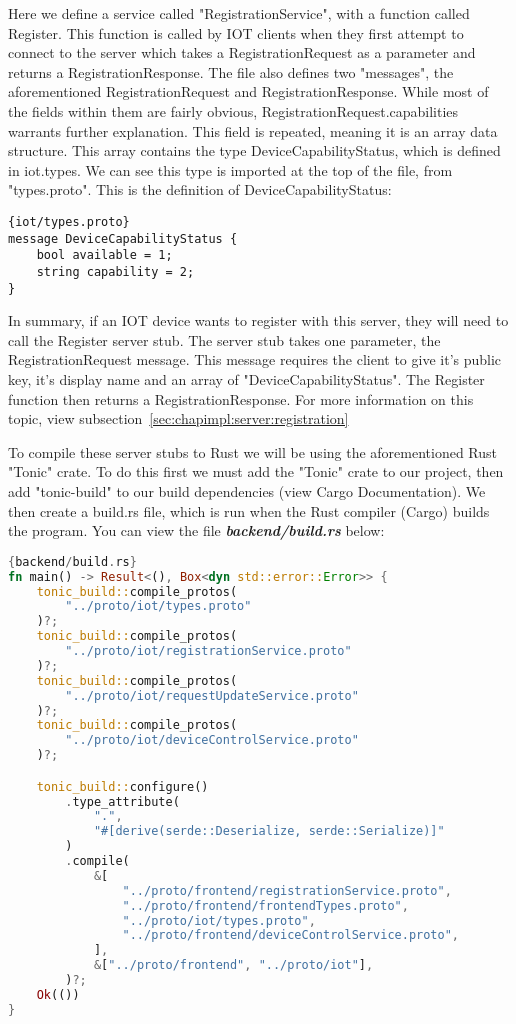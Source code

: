 Here we define a service called "RegistrationService", with a function called Register. This function is called by IOT clients when they first attempt to connect to the server which takes a RegistrationRequest as a parameter and returns a RegistrationResponse. The file also defines two "messages", the aforementioned RegistrationRequest and RegistrationResponse. While most of the fields within them are fairly obvious, RegistrationRequest.capabilities warrants further explanation.
    This field is repeated, meaning it is an array data structure. This array contains the type DeviceCapabilityStatus, which is defined in iot.types. We can see this type is imported at the top of the file, from "types.proto". This is the definition of DeviceCapabilityStatus:

\begin{lstlisting}[language=protobuf3, style=boxed]{iot/types.proto}
message DeviceCapabilityStatus {
    bool available = 1;
    string capability = 2;
}
\end{lstlisting}

In summary, if an IOT device wants to register with this server, they will need to call the Register server stub. The server stub takes one parameter, the RegistrationRequest message. This message requires the client to give it's public key, it's display name and an array of "DeviceCapabilityStatus". The Register function then returns a RegistrationResponse. For more information on this topic, view subsection~\ref{sec:chapimpl:server:registration}

To compile these server stubs to Rust we will be using the aforementioned Rust "Tonic" crate. To do this first we must add the "Tonic" crate to our project, then add "tonic-build" to our build dependencies (view Cargo Documentation). We then create a build.rs file, which is run when the Rust compiler (Cargo) builds the program. You can view the file \textbf{\textit{backend/build.rs}} below:

\begin{lstlisting}[language=Rust, style=boxed, showstringspaces=false]{backend/build.rs}
fn main() -> Result<(), Box<dyn std::error::Error>> {
    tonic_build::compile_protos(
        "../proto/iot/types.proto"
    )?;
    tonic_build::compile_protos(
        "../proto/iot/registrationService.proto"
    )?;
    tonic_build::compile_protos(
        "../proto/iot/requestUpdateService.proto"
    )?;
    tonic_build::compile_protos(
        "../proto/iot/deviceControlService.proto"
    )?;

    tonic_build::configure()
        .type_attribute(
            ".", 
            "#[derive(serde::Deserialize, serde::Serialize)]"
        )
        .compile(
            &[
                "../proto/frontend/registrationService.proto",
                "../proto/frontend/frontendTypes.proto",
                "../proto/iot/types.proto",
                "../proto/frontend/deviceControlService.proto",
            ],
            &["../proto/frontend", "../proto/iot"],
        )?;
    Ok(())
}
\end{lstlisting}

